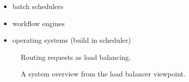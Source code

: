 \begin{itemize}
	\item batch schedulers
	\item workflow engines
	\item operating systems (build in scheduler)
\end{itemize}

\begin{figure}
	\centering	
	\scalebox{0.7}{}
	\caption[Routing requests as load balancing]{
		\label{fig:loadBalancingSetup} 
		\footnotesize{%
			Routing requests as load balancing.
		}
	}
\end{figure}

\begin{figure}
	\centering	
	\scalebox{0.7}{}
	\caption[System overview from the load balancer viewpoint]{
		\label{fig:loadBalancingSetup} 
		\footnotesize{%
			A system overview from the load balancer viewpoint.
		}
	}
\end{figure}















